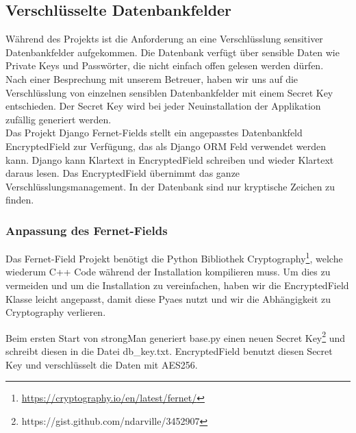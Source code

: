 \subsection{Verschlüsselte Datenbankfelder}
Während des Projekts ist die Anforderung an eine Verschlüsslung sensitiver Datenbankfelder aufgekommen. Die Datenbank verfügt über sensible Daten wie Private Keys und Passwörter, die nicht einfach offen gelesen werden dürfen.\\


Nach einer Besprechung mit unserem Betreuer, haben wir uns auf die Verschlüsslung von einzelnen sensiblen Datenbankfelder mit einem Secret Key entschieden. Der Secret Key wird bei jeder Neuinstallation der Applikation zufällig generiert werden.\\
Das Projekt  Django Fernet-Fields \cite{fernet-fields} stellt ein angepasstes Datenbankfeld EncryptedField zur Verfügung, das als Django ORM Feld verwendet werden kann. Django kann Klartext in EncryptedField schreiben und wieder Klartext daraus lesen. Das EncryptedField übernimmt das ganze Verschlüsslungsmanagement. In der Datenbank sind nur kryptische Zeichen zu finden.

\subsubsection{Anpassung des Fernet-Fields}
Das Fernet-Field Projekt benötigt die Python Bibliothek Cryptography\footnote{\url{https://cryptography.io/en/latest/fernet/}}, welche wiederum C++ Code während der Installation kompilieren muss. Um dies zu vermeiden und um die Installation zu vereinfachen, haben wir die EncryptedField Klasse leicht angepasst, damit diese Pyaes nutzt und wir die Abhängigkeit zu Cryptography verlieren.

Beim ersten Start von strongMan generiert base.py einen neuen Secret Key\footnote{https://gist.github.com/ndarville/3452907} und schreibt diesen in die Datei db\_key.txt.
EncryptedField benutzt diesen Secret Key und verschlüsselt die Daten mit AES256.